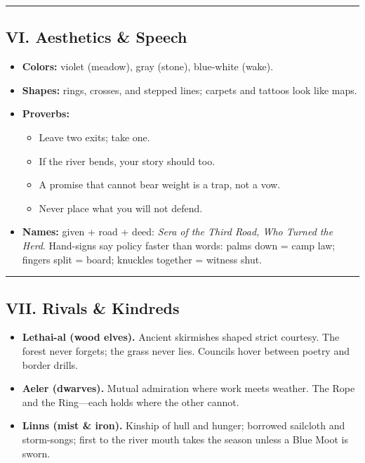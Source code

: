 \documentclass[11pt,letterpaper]{article}
\begin{document}
\medskip\hrule\medskip

\subsection{VI. Aesthetics \& Speech}

\begin{itemize}[leftmargin=*]
  \item \textbf{Colors:} violet (meadow), gray (stone), blue-white (wake).
  \item \textbf{Shapes:} rings, crosses, and stepped lines; carpets and tattoos look like maps.
  \item \textbf{Proverbs:}
    \begin{itemize}
      \item Leave two exits; take one.
      \item If the river bends, your story should too.
      \item A promise that cannot bear weight is a trap, not a vow.
      \item Never place what you will not defend.
    \end{itemize}
  \item \textbf{Names:} given + road + deed: \emph{Sera of the Third Road, Who Turned the Herd}. Hand-signs say policy faster than words: palms down = camp law; fingers split = board; knuckles together = witness shut.
\end{itemize}

\medskip\hrule\medskip

\subsection{VII. Rivals \& Kindreds}

\begin{itemize}[leftmargin=*]
  \item \textbf{Lethai-al (wood elves).} Ancient skirmishes shaped strict courtesy. The forest never forgets; the grass never lies. Councils hover between poetry and border drills.
  \item \textbf{Aeler (dwarves).} Mutual admiration where work meets weather. The Rope and the Ring---each holds where the other cannot.
  \item \textbf{Linns (mist \& iron).} Kinship of hull and hunger; borrowed sailcloth and storm-songs; first to the river mouth takes the season unless a Blue Moot is sworn.
\end{itemize}
\end{document}
